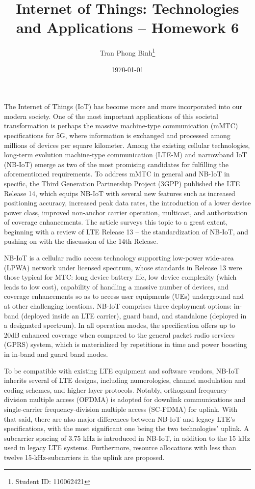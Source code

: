 \documentclass[12pt, a4paper, onside]{article}
\title{\textbf{Internet of Things: Technologies and Applications -- Homework 6}}
\author{Tran Phong Binh\thanks{Student ID: 110062421}}
\affil{Department of Computer Science, National Tsing Hua University}
\date{\today}
\begin{document}
\maketitle

The Internet of Things (IoT) has become more and more incorporated into our modern society. One of the most important applications of this societal transformation is perhaps the massive machine-type communication (mMTC) specifications for 5G, where information is exchanged and processed among millions of devices per square kilometer. Among the existing cellular technologies, long-term evolution machine-type communication (LTE-M) and narrowband IoT (NB-IoT) emerge as two of the most promising candidates for fulfilling the aforementioned requirements. To address mMTC in general and NB-IoT in specific, the Third Generation Partnership Project (3GPP) published the LTE Release 14, which equips NB-IoT with several new features such as increased positioning accuracy, increased peak data rates, the introduction of a lower device power class, improved non-anchor carrier operation, multicast, and authorization of coverage enhancements. The article \cite{nbiot} surveys this topic to a great extent, beginning with a review of LTE Release 13 -- the standardization of NB-IoT, and pushing on with the discussion of the 14th Release.

NB-IoT is a cellular radio access technology supporting low-power wide-area (LPWA) network under licensed spectrum, whose standards in Release 13 were those typical for MTC: long device battery life, low device complexity (which leads to low cost), capability of handling a massive number of devices, and coverage enhancements so as to access user equipments (UEs) underground and at other challenging locations. NB-IoT comprises three deployment options: in-band (deployed inside an LTE carrier), guard band, and standalone (deployed in a designated spectrum). In all operation modes, the specification offers up to 20dB enhanced coverage when compared to the general packet radio services (GPRS) system, which is materialized by repetitions in time and power boosting in in-band and guard band modes.

To be compatible with existing LTE equipment and software vendors, NB-IoT inherits several of LTE designs, including numerologies, channel modulation and coding schemes, and higher layer protocols. Notably, orthogonal frequency-division multiple access (OFDMA) is adopted for downlink communications and single-carrier frequency-division multiple access (SC-FDMA) for uplink. With that said, there are also major differences between NB-IoT and legacy LTE's specifications, with the most significant one being the two technologies' uplink. A subcarrier spacing of 3.75 kHz is introduced in NB-IoT, in addition to the 15 kHz used in legacy LTE systems. Furthermore, resource allocations with less than twelve 15-kHz-subcarriers in the uplink are proposed.
\end{document}
